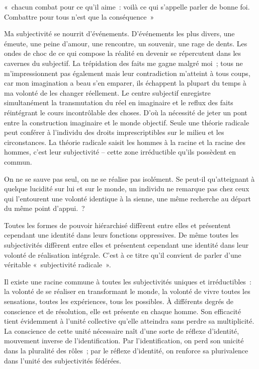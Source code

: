 \documentclass[french,twoside]{book} %
\newcommand{\bibl}[1]{{\RaggedLeft{#1}\par\bigskip}}
\newenvironment{quoteblock}%
  {\begin{quoting}}
  {\end{quoting}}
\newenvironment{quotebar}{%
    \def\FrameCommand{{\color{rubric!10!}\vrule width 0.5em} \hspace{0.9em}}%
    \def\OuterFrameSep{\itemsep} %
    \MakeFramed {\advance\hsize-\width \FrameRestore}
  }%
  {%
    \endMakeFramed
  }
\renewenvironment{quoteblock}%
  {%
    \savenotes
    \setstretch{0.9}
    \normalfont
    \begin{quotebar}
  }
  {%
    \end{quotebar}
    \spewnotes
  }
\begin{document}
\begin{quoteblock}
 \noindent « chacun combat pour ce qu’il aime : voilà ce qui s’appelle parler de bonne foi. Combattre pour tous n’est que la conséquence »\par
 
\bibl{(Saint-Just).}
 \end{quoteblock}

\noindent Ma subjectivité se nourrit d’événements. D’événements les plus divers, une émeute, une peine d’amour, une rencontre, un souvenir, une rage de dents. Les ondes de choc de ce qui compose la réalité en devenir se répercutent dans les cavernes du subjectif. La trépidation des faits me gagne malgré moi ; tous ne m’impressionnent pas également mais leur contradiction m’atteint à tous coups, car mon imagination a beau s’en emparer, ils échappent la plupart du temps à ma volonté de les changer réellement. Le centre subjectif enregistre simultanément la transmutation du réel en imaginaire et le reflux des faits réintégrant le cours incontrôlable des choses. D’où la nécessité de jeter un pont entre la construction imaginaire et le monde objectif. Seule une théorie radicale peut conférer à l’individu des droits imprescriptibles sur le milieu et les circonstances. La théorie radicale saisit les hommes à la racine et la racine des hommes, c’est leur subjectivité – cette zone irréductible qu’ils possèdent en commun.\par
On ne se sauve pas seul, on ne se réalise pas isolément. Se peut-il qu’atteignant à quelque lucidité sur lui et sur le monde, un individu ne remarque pas chez ceux qui l’entourent une volonté identique à la sienne, une même recherche au départ du même point d’appui. ?\par
Toutes les formes de pouvoir hiérarchisé diffèrent entre elles et présentent cependant une identité dans leurs fonctions oppressives. De même toutes les subjectivités diffèrent entre elles et présentent cependant une identité dans leur volonté de réalisation intégrale. C’est à ce titre qu’il convient de parler d’une véritable « subjectivité radicale ».\par
Il existe une racine commune à toutes les subjectivités uniques et irréductibles : la volonté de se réaliser en transformant le monde, la volonté de vivre toutes les sensations, toutes les expériences, tous les possibles. À différents degrés de conscience et de résolution, elle est présente en chaque homme. Son efficacité tient évidemment à l’unité collective qu’elle atteindra sans perdre sa multiplicité. La conscience de cette unité nécessaire naît d’une sorte de réflexe d’identité, mouvement inverse de l’identification. Par l’identification, on perd son unicité dans la pluralité des rôles ; par le réflexe d’identité, on renforce sa plurivalence dans l’unité des subjectivités fédérées.\par
\end{document}
